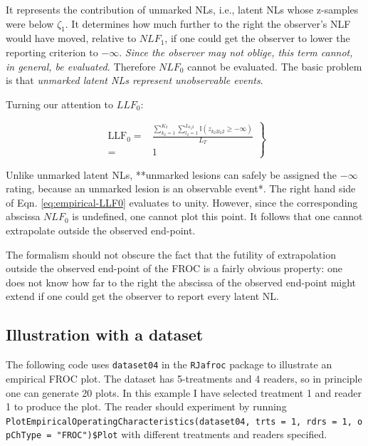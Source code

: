 \documentclass[
]{book}
\begin{document}
It represents the contribution of unmarked NLs, i.e., latent NLs whose z-samples were below \(\zeta_1\). It determines how much further to the right the observer's NLF would have moved, relative to \(NLF_1\), if one could get the observer to lower the reporting criterion to \(-\infty\). \emph{Since the observer may not oblige, this term cannot, in general, be evaluated.} Therefore \(NLF_0\) cannot be evaluated. The basic problem is that \emph{unmarked latent NLs represent unobservable events}.

Turning our attention to \(LLF_0\):

\begin{equation}
\left.
\begin{aligned}
\text{LLF}_0 =& \frac{ \sum_{k_2=1}^{K_2} \sum_{l_2=1}^{L_{k_2 2}} \mathbb{I} \left ( z_{k_2 2 l_2 2} \geq  -\infty  \right ) }{L_T}\\
=& 1
\end{aligned}
\right \}
\label{eq:empirical-LLF0}
\end{equation}

Unlike unmarked latent NLs, **unmarked lesions can safely be assigned the \(-\infty\) rating, because an unmarked lesion is an observable event*. The right hand side of Eqn. \eqref{eq:empirical-LLF0} evaluates to unity. However, since the corresponding abscissa \(NLF_0\) is undefined, one cannot plot this point. It follows that one cannot extrapolate outside the observed end-point.

The formalism should not obscure the fact that the futility of extrapolation outside the observed end-point of the FROC is a fairly obvious property: one does not know how far to the right the abscissa of the observed end-point might extend if one could get the observer to report every latent NL.

\hypertarget{empirical-froc-plot-illustration}{%
\subsection{Illustration with a dataset}\label{empirical-froc-plot-illustration}}

The following code uses \texttt{dataset04} \citep{zanca2009evaluation} in the \texttt{RJafroc} package to illustrate an empirical FROC plot. The dataset has 5-treatments and 4 readers, so in principle one can generate 20 plots. In this example I have selected treatment 1 and reader 1 to produce the plot. The reader should experiment by running \texttt{PlotEmpiricalOperatingCharacteristics(dataset04,\ trts\ =\ 1,\ rdrs\ =\ 1,\ opChType\ =\ "FROC")\$Plot} with different treatments and readers specified.
\end{document}
